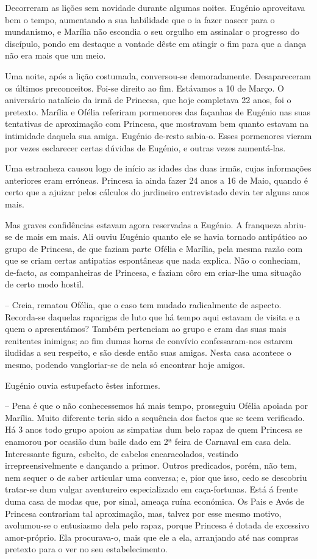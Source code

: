 \documentclass[9pt]{article}
\begin{document}
Decorreram as li\-ções sem novidade durante algumas noites. Eugé\-nio
aproveitava bem o tempo, aumentando a sua habilidade que o ia fazer nascer para o mundanismo, e Marília não escondia o seu orgu\-lho em assinalar
o progresso do discípulo, pondo em destaque a vontade dêste em atingir o
fim para que a dan\-ça não era mais que um meio.

Uma noite, após a li\-ção costumada, conversou-se demoradamente. Desapareceram os últimos preconceitos. Foi-se direito ao fim. Estáva\-mos a 10
de Março. O aniversário natalício da irmã de Princesa, que hoje completava 22 anos, foi o pretexto. Marília e Ofélia referiram pormenores das
façanhas de Eugé\-nio nas suas tentativas de aproxima\-ção com Princesa, que
mostravam bem quanto estavam na intimidade daquela sua amiga. Eugé\-nio de-resto sabia-o. Esses pormenores vieram por vezes esclarecer certas dúvidas
de Eugé\-nio, e outras vezes aumentá-las.

Uma estranheza causou logo de início as idades das duas irmãs, cujas
informa\-ções anteriores eram erróneas. Princesa ia ainda fazer 24 anos a
16 de Maio, quan\-do é certo que a ajuizar pelos cálculos do
jardineiro entrevistado devia ter alguns anos mais.

Mas graves confidên\-cias estavam agora reservadas a Eugé\-nio. A franqueza abriu-se de mais em mais. Ali ouviu Eugé\-nio quanto ele se havia tornado antipático ao grupo de Princesa, de que faziam parte Ofélia e Marília,
pela mesma razão com que se criam certas antipatias espontâneas que nada
explica. Não o conheciam, de-facto, as companheiras de Princesa, e faziam
côro em criar-\-lhe uma situa\-ção de certo modo hostil.

-- Creia, rematou Ofélia, que o caso tem mudado radicalmente de aspecto.
Recorda-se daquelas raparigas de luto que há tempo aqui estavam de visita
e a quem o apresentámos? Também pertenciam ao grupo e eram das suas mais
renitentes inimigas; ao fim dumas horas de con\-ví\-vio confessaram-nos estarem
iludidas a seu respeito, e são desde então suas amigas. Nesta casa acontece
o mesmo, podendo vangloriar-se de nela só encontrar hoje amigos.

Eugé\-nio ouvia estupefacto êstes informes.

-- Pena é que o não conhecessemos há mais tempo, prosseguiu Ofélia
apoiada por Marília. Muito diferente teria sido a sequência dos factos que
se teem verifi\-cado. Há 3 anos todo grupo apoiou as simpatias dum belo
rapaz de quem Princesa se enamorou por ocasião dum baile dado em 2ª feira
de Carnaval em casa dela. Interessante figura, esbelto, de cabelos encaracolados, vestindo irrepreensivelmente e dan\-çando a primor. Outros predicados,
porém, não tem, nem sequer o de saber articular uma conversa; e, pior que isso,
cedo se descobriu tratar-se dum vulgar aventureiro especializado em caça-fortunas. Está á frente duma casa de modas que, por sinal, ameaça ruína económica. Os Pais e Avós de Princesa contrariam tal aproxima\-ção, mas, talvez
por esse mesmo motivo, avolumou-se o entusiasmo dela pelo rapaz, porque Princesa é dotada de excessivo amor-próprio. Ela procurava-o, mais que ele a
ela, arranjando até nas compras pretexto para o ver no seu estabelecimento.
\end{document}
